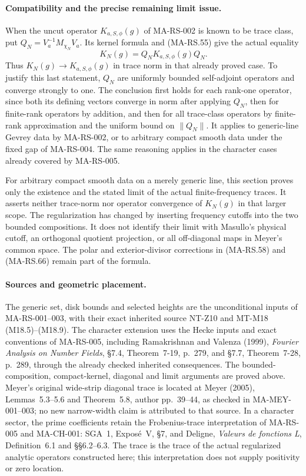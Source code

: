 \paragraph{Compatibility and the precise remaining limit issue.}
When the uncut operator $K_{a,S,\phi}(g)$ of MA-RS-002
is known to be trace class, put
$Q_N=V_a^{-1}M_{\chi_N}V_a$. Its kernel formula and
(MA-RS.55) give the actual equality
\[
           K_N(g)=Q_NK_{a,S,\phi}(g)Q_N.
 \tag{MA-RS.67}
\]
Thus $K_N(g)\to K_{a,S,\phi}(g)$ in trace norm in that
already proved case. To justify this last statement,
$Q_N$ are uniformly bounded self-adjoint operators and
converge strongly to one. The conclusion first holds for
each rank-one operator, since both its defining vectors
converge in norm after applying $Q_N$, then for finite-rank
operators by addition, and then for all trace-class
operators by finite-rank approximation and the uniform
bound on $\|Q_N\|$. It applies to generic-line Gevrey
data by MA-RS-002, or to arbitrary compact smooth data
under the fixed gap of MA-RS-004. The same reasoning
applies in the character cases already covered by
MA-RS-005.

For arbitrary compact smooth data on a merely generic line,
this section proves only the existence and the stated
limit of the actual finite-frequency traces.
It asserts neither trace-norm nor operator convergence
of $K_N(g)$ in that larger scope. The regularization has
changed by inserting frequency cutoffs into the two
bounded compositions. It does not identify their limit
with Masullo's physical cutoff, an orthogonal quotient
projection, or all off-diagonal maps in Meyer's common
space. The polar and exterior-divisor corrections in
(MA-RS.58) and (MA-RS.66) remain part of the formula.

\paragraph{Sources and geometric placement.}
The generic set, disk bounds and selected heights are
the unconditional inputs of MA-RS-001--003, with their
exact inherited source NT-Z10 and MT-M18
(M18.5)--(M18.9). The character extension uses the
Hecke inputs and exact conventions of MA-RS-005,
including Ramakrishnan and Valenza (1999),
\emph{Fourier Analysis on Number Fields}, \S7.4,
Theorem~7-19, p.~279, and \S7.7, Theorem~7-28, p.~289,
through the already checked inherited consequences.
The bounded-composition, compact-kernel, diagonal and
limit arguments are proved above. Meyer's original
wide-strip diagonal trace is located at Meyer (2005),
Lemmas~5.3--5.6 and Theorem~5.8, author pp.~39--44,
as checked in MA-MEY-001--003; no new narrow-width
claim is attributed to that source.
In a character sector, the prime coefficients retain
the Frobenius-trace interpretation of MA-RS-005 and
MA-CH-001: SGA~1, Expos\'e~V, \S7, and Deligne,
\emph{Valeurs de fonctions L}, Definition~6.1 and
\S\S6.2--6.3. The trace is the trace of the actual
regularized analytic operators constructed here;
this interpretation does not supply positivity or
zero location.
